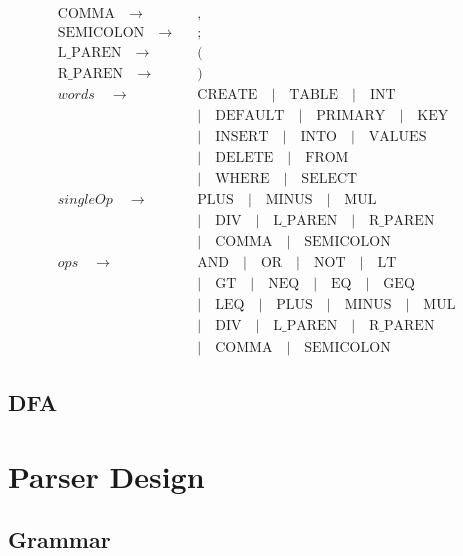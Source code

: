 \documentclass{article}
\begin{document}
\begin{align*}
\text{COMMA}\quad\to\quad & \texttt{,} \\
\text{SEMICOLON}\quad\to\quad & \texttt{;} \\
\text{L\_PAREN}\quad\to\quad & \texttt{(} \\
\text{R\_PAREN}\quad\to\quad & \texttt{)} \\
words \quad\to\quad & \text{CREATE} \quad | \quad \text{TABLE}  \quad | \quad \text{INT} \\
&| \quad \text{DEFAULT} \quad | \quad \text{PRIMARY} \quad | \quad \text{KEY} \quad \\
&| \quad \text{INSERT} \quad | \quad \text{INTO} \quad | \quad \text{VALUES} \quad \\
&| \quad \text{DELETE} \quad | \quad \text{FROM} \quad \\
&| \quad \text{WHERE} \quad | \quad \text{SELECT} \\
singleOp \quad\to\quad &
\text{PLUS} \quad | \quad \text{MINUS} \quad | \quad \text{MUL} \\
&| \quad \text{DIV} \quad | \quad \text{L\_PAREN} \quad | \quad \text{R\_PAREN} \\
&| \quad \text{COMMA} \quad | \quad \text{SEMICOLON} \\
ops \quad\to\quad &
\text{AND} \quad | \quad \text{OR} \quad | \quad \text{NOT} \quad | \quad \text{LT} \\
&| \quad \text{GT} \quad | \quad \text{NEQ} \quad | \quad \text{EQ} \quad | \quad \text{GEQ} \\
&| \quad \text{LEQ} \quad | \quad \text{PLUS} \quad | \quad \text{MINUS} \quad | \quad \text{MUL} \\
&| \quad \text{DIV} \quad | \quad \text{L\_PAREN} \quad | \quad \text{R\_PAREN} \\
&| \quad \text{COMMA} \quad | \quad \text{SEMICOLON}
\end{align*}
\subsection{DFA}

\section{Parser Design}

\subsection{Grammar}
\end{document}
